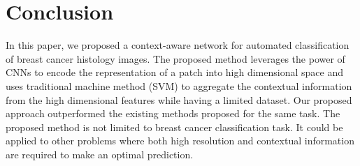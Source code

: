 \documentclass[runningheads,a4paper]{llncs}
\begin{document}
\section{Conclusion}

In this paper, we proposed a context-aware network for automated classification of breast cancer histology images. The proposed method leverages the power of CNNs to encode the representation of a patch into high dimensional space and uses traditional machine method (SVM) to aggregate the contextual information from the high dimensional features while having a limited dataset. Our proposed approach outperformed the existing methods proposed for the same task. The proposed method is not limited to breast cancer classification task. It could be applied to other problems where both high resolution and contextual information are required to make an optimal prediction.

%
\end{document}
